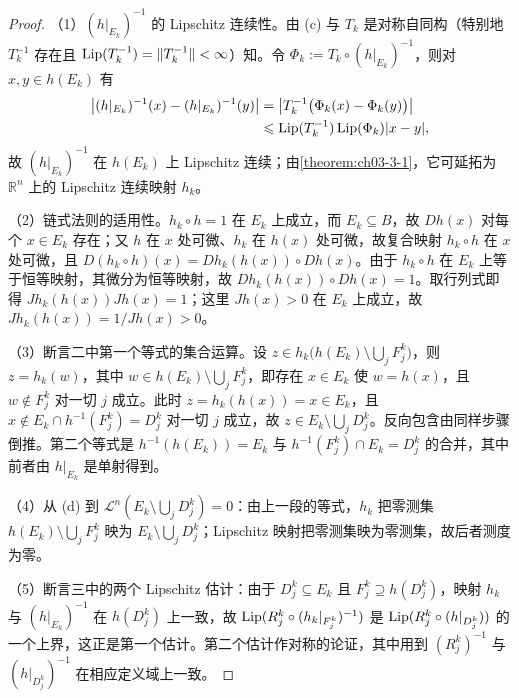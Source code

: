 \documentclass[../../main.tex]{subfiles}%
\begin{document}
\begin{proof}
（1）$(h|_{E_k})^{-1}$ 的 Lipschitz 连续性。由 (c) 与 $T_k$ 是对称自同构（特别地 $T_k^{-1}$ 存在且 $\operatorname{Lip}(T_k^{-1})=\lVert T_k^{-1}\rVert<\infty$）知。令 $\Phi_k:=T_k\circ(h|_{E_k})^{-1}$，则对 $x,y\in h(E_k)$ 有
\begin{align*}
\bigl\lvert (h|_{E_k})^{-1}(x)-(h|_{E_k})^{-1}(y)\bigr\rvert&=\bigl\lvert T_k^{-1}\bigl(\Phi_k(x)-\Phi_k(y)\bigr)\bigr\rvert\\
&\leqslant\operatorname{Lip}(T_k^{-1})\operatorname{Lip}(\Phi_k)\lvert x-y\rvert,
\end{align*}
故 $(h|_{E_k})^{-1}$ 在 $h(E_k)$ 上 Lipschitz 连续；由\cref{theorem:ch03-3-1}，它可延拓为 $\mathbb{R}^n$ 上的 Lipschitz 连续映射 $h_k$。%

（2）链式法则的适用性。$h_k\circ h=1$ 在 $E_k$ 上成立，而 $E_k\subseteq B$，故 $Dh(x)$ 对每个 $x\in E_k$ 存在；又 $h$ 在 $x$ 处可微、$h_k$ 在 $h(x)$ 处可微，故复合映射 $h_k\circ h$ 在 $x$ 处可微，且 $D(h_k\circ h)(x)=Dh_k(h(x))\circ Dh(x)$。由于 $h_k\circ h$ 在 $E_k$ 上等于恒等映射，其微分为恒等映射，故 $Dh_k(h(x))\circ Dh(x)=1$。取行列式即得 $Jh_k(h(x))Jh(x)=1$；这里 $Jh(x)>0$ 在 $E_k$ 上成立，故 $Jh_k(h(x))=1/Jh(x)>0$。

（3）断言二中第一个等式的集合运算。设 $z\in h_k\bigl(h(E_k)\setminus\bigcup_jF_j^k\bigr)$，则 $z=h_k(w)$，其中 $w\in h(E_k)\setminus\bigcup_jF_j^k$，即存在 $x\in E_k$ 使 $w=h(x)$，且 $w\notin F_j^k$ 对一切 $j$ 成立。此时 $z=h_k(h(x))=x\in E_k$，且 $x\notin E_k\cap h^{-1}(F_j^k)=D_j^k$ 对一切 $j$ 成立，故 $z\in E_k\setminus\bigcup_jD_j^k$。反向包含由同样步骤倒推。第二个等式是 $h^{-1}(h(E_k))=E_k$ 与 $h^{-1}(F_j^k)\cap E_k=D_j^k$ 的合并，其中前者由 $h|_{E_k}$ 是单射得到。

（4）从 (d) 到 $\mathcal{L}^n(E_k\setminus\bigcup_jD_j^k)=0$：由上一段的等式，$h_k$ 把零测集 $h(E_k)\setminus\bigcup_jF_j^k$ 映为 $E_k\setminus\bigcup_jD_j^k$；Lipschitz 映射把零测集映为零测集，故后者测度为零。

（5）断言三中的两个 Lipschitz 估计：由于 $D_j^k\subseteq E_k$ 且 $F_j^k\supseteq h(D_j^k)$，映射 $h_k$ 与 $(h|_{E_k})^{-1}$ 在 $h(D_j^k)$ 上一致，故 $\operatorname{Lip}(R_j^k\circ(h_k|_{F_j^k})^{-1})$ 是 $\operatorname{Lip}(R_j^k\circ(h|_{D_j^k}))$ 的一个上界，这正是第一个估计。第二个估计作对称的论证，其中用到 $(R_j^k)^{-1}$ 与 $(h|_{D_j^k})^{-1}$ 在相应定义域上一致。
\end{proof}
\end{document}
